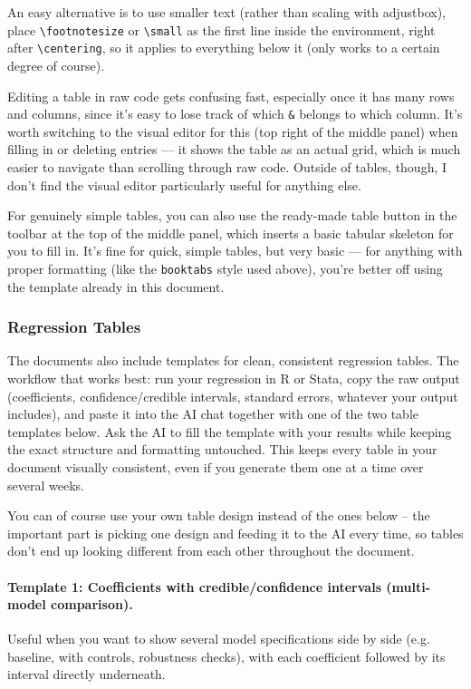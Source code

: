 An easy alternative is to use smaller text (rather than scaling with adjustbox), place \verb|\footnotesize| or \verb|\small| as the first line inside the environment, right after \verb|\centering|, so it applies to everything below it (only works to a certain degree of course).

Editing a table in raw code gets confusing fast, especially once it has many rows and columns, since it's easy to lose track of which \verb|&| belongs to which column. It's worth switching to the visual editor for this (top right of the middle panel) when filling in or deleting entries --- it shows the table as an actual grid, which is much easier to navigate than scrolling through raw code. Outside of tables, though, I don't find the visual editor particularly useful for anything else.

For genuinely simple tables, you can also use the ready-made table button in the toolbar at the top of the middle panel, which inserts a basic tabular skeleton for you to fill in. It's fine for quick, simple tables, but very basic --- for anything with proper formatting (like the \texttt{booktabs} style used above), you're better off using the template already in this document.

\subsubsection*{Regression Tables}

The documents also include templates for clean, consistent regression tables. The workflow that works best: run your regression in R or Stata, copy the raw output (coefficients, confidence/credible intervals, standard errors, whatever your output includes), and paste it into the AI chat together with one of the two table templates below. Ask the AI to fill the template with your results while keeping the exact structure and formatting untouched. This keeps every table in your document visually consistent, even if you generate them one at a time over several weeks.

You can of course use your own table design instead of the ones below -- the important part is picking one design and feeding it to the AI every time, so tables don't end up looking different from each other throughout the document.

\paragraph{Template 1: Coefficients with credible/confidence intervals (multi-model comparison).}
Useful when you want to show several model specifications side by side (e.g. baseline, with controls, robustness checks), with each coefficient followed by its interval directly underneath.

